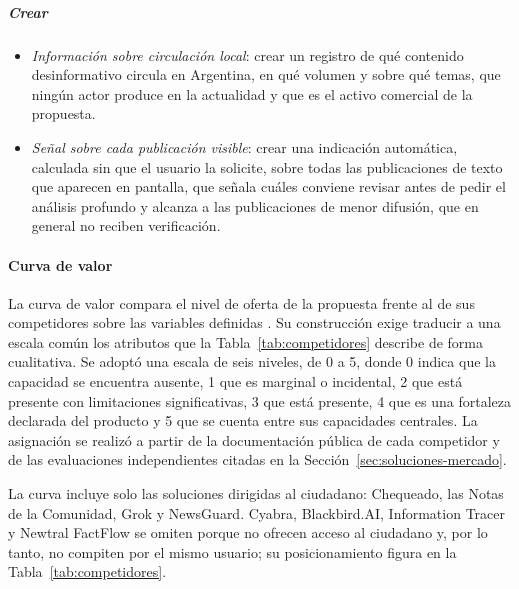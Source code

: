 \subparagraph{Crear}
\begin{itemize}[leftmargin=1.1cm, topsep=2pt, itemsep=2pt]
  \item \textit{Información sobre circulación local}: crear un registro de qué contenido desinformativo circula en Argentina, en qué volumen y sobre qué temas, que ningún actor produce en la actualidad y que es el activo comercial de la propuesta.
  \item \textit{Señal sobre cada publicación visible}: crear una indicación automática, calculada sin que el usuario la solicite, sobre todas las publicaciones de texto que aparecen en pantalla, que señala cuáles conviene revisar antes de pedir el análisis profundo y alcanza a las publicaciones de menor difusión, que en general no reciben verificación.
\end{itemize}

\paragraph{Curva de valor}

La curva de valor compara el nivel de oferta de la propuesta frente al de sus competidores sobre las variables definidas \parencite{KimMauborgne2015}. Su construcción exige traducir a una escala común los atributos que la Tabla~\ref{tab:competidores} describe de forma cualitativa. Se adoptó una escala de seis niveles, de 0 a 5, donde 0 indica que la capacidad se encuentra ausente, 1 que es marginal o incidental, 2 que está presente con limitaciones significativas, 3 que está presente, 4 que es una fortaleza declarada del producto y 5 que se cuenta entre sus capacidades centrales. La asignación se realizó a partir de la documentación pública de cada competidor y de las evaluaciones independientes citadas en la Sección~\ref{sec:soluciones-mercado}.

La curva incluye solo las soluciones dirigidas al ciudadano: Chequeado, las Notas de la Comunidad, Grok y NewsGuard. Cyabra, Blackbird.AI, Information Tracer y Newtral FactFlow se omiten porque no ofrecen acceso al ciudadano y, por lo tanto, no compiten por el mismo usuario; su posicionamiento figura en la Tabla~\ref{tab:competidores}.

